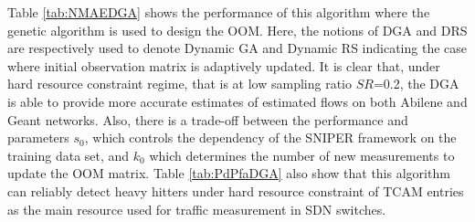 Table \ref{tab:NMAEDGA} shows the performance of this algorithm where the genetic algorithm is used to design the OOM. Here, the notions of DGA and DRS are respectively used to denote Dynamic GA and Dynamic RS indicating the case where initial observation matrix is adaptively updated. It is clear that, under hard resource constraint regime, that is at low sampling ratio $SR$=0.2, the DGA is able to provide more accurate estimates of estimated flows on both Abilene and Geant networks. Also, there is a trade-off between the performance and parameters $s_{0}$, which controls the dependency of the SNIPER framework on the training data set, and $k_{0}$ which determines the number of new measurements to update the OOM matrix. Table \ref{tab:PdPfaDGA} also show that this algorithm can reliably detect heavy hitters under hard resource constraint of TCAM entries as the main resource used for traffic measurement in SDN switches.

%
%


